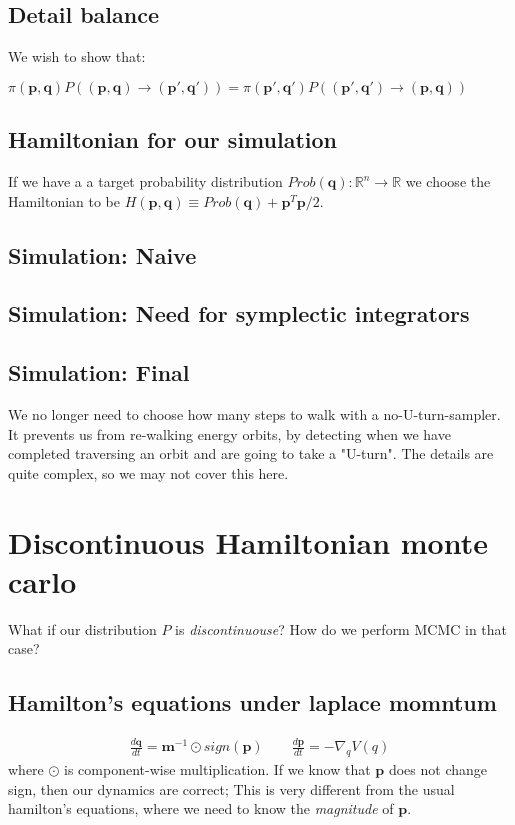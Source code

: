 \documentclass[titlepage]{article}
\newcommand{\R}{\mathbb{R}}
\newcommand{\p}{\mathbf{p}}
\newcommand{\q}{\mathbf{q}}
\newcommand{\m}{\mathbf{m}}
\begin{document}
\subsection{Detail balance}

We wish to show that:

$\pi(\p, \q) P((\p, \q) \rightarrow (\p', \q')) = \pi(\p', \q') P((\p', \q') \rightarrow (\p, \q))$


\subsection{Hamiltonian for our simulation}
If we have a a target probability distribution $Prob(\q): \R^n \rightarrow \R$
we choose the Hamiltonian to be $H(\p, \q) \equiv Prob(\q) + \p^T \p/2$.


\subsection{Simulation: Naive}
\subsection{Simulation: Need for symplectic integrators}
\subsection{Simulation: Final}


We no longer need to choose how many steps to walk with a no-U-turn-sampler.
It prevents us from re-walking energy orbits, by detecting when we have completed
traversing an orbit and are going to take a "U-turn". The details are quite
complex, so we may not cover this here.

\section{Discontinuous Hamiltonian monte carlo}

What if our distribution $P$ is \emph{discontinuouse}? How do we perform MCMC
in that case?

\subsection{Hamilton's equations under laplace momntum}

\begin{align*}
    \frac{d \q}{dt} = \m^{-1} \odot sign(\p) \qquad \frac{d \p}{dt} = - \nabla_q V(q)
\end{align*}
where $\odot$ is component-wise multiplication. If we know that $\p$ does
not change sign, then our dynamics are correct; This is very different from
the usual hamilton's equations, where we need to know the \emph{magnitude}
of $\p$.
\end{document}
